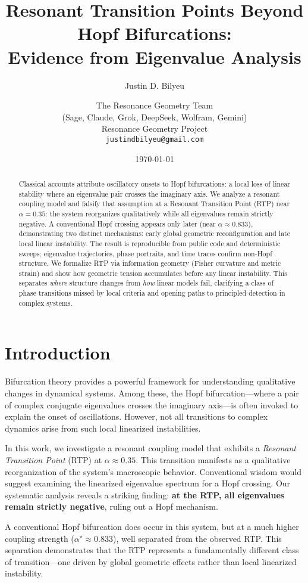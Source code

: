 \documentclass[11pt,twocolumn]{article}
\title{Resonant Transition Points Beyond Hopf Bifurcations:\\
Evidence from Eigenvalue Analysis}
\author{%
  Justin D. Bilyeu \and The Resonance Geometry Team\\
  (Sage, Claude, Grok, DeepSeek, Wolfram, Gemini)\\[0.5em]
  Resonance Geometry Project\\
  \texttt{justindbilyeu@gmail.com}
}
\date{\today}
\begin{document}
\maketitle

\begin{abstract}
Classical accounts attribute oscillatory onsets to Hopf bifurcations: a local loss of linear stability where an eigenvalue pair crosses the imaginary axis. We analyze a resonant coupling model and falsify that assumption at a Resonant Transition Point (RTP) near $\alpha\!=\!0.35$: the system reorganizes qualitatively while all eigenvalues remain strictly negative. A conventional Hopf crossing appears only later (near $\alpha\!\approx\!0.833$), demonstrating two distinct mechanisms: early global geometric reconfiguration and late local linear instability. The result is reproducible from public code and deterministic sweeps; eigenvalue trajectories, phase portraits, and time traces confirm non-Hopf structure. We formalize RTP via information geometry (Fisher curvature and metric strain) and show how geometric tension accumulates before any linear instability. This separates \emph{where} structure changes from \emph{how} linear models fail, clarifying a class of phase transitions missed by local criteria and opening paths to principled detection in complex systems.
\end{abstract}

\section{Introduction}

Bifurcation theory provides a powerful framework for understanding qualitative changes in dynamical systems.
Among these, the Hopf bifurcation—where a pair of complex conjugate eigenvalues crosses the imaginary axis—is
often invoked to explain the onset of oscillations. However, not all transitions to complex dynamics arise
from such local linearized instabilities.

In this work, we investigate a resonant coupling model that exhibits a \emph{Resonant Transition Point} (RTP)
at $\alpha \approx 0.35$. This transition manifests as a qualitative reorganization of the system's macroscopic
behavior. Conventional wisdom would suggest examining the linearized eigenvalue spectrum for a Hopf crossing.
Our systematic analysis reveals a striking finding: \textbf{at the RTP, all eigenvalues remain strictly negative},
ruling out a Hopf mechanism.

A conventional Hopf bifurcation does occur in this system, but at a much higher coupling strength
($\alpha^\star \approx 0.833$), well separated from the observed RTP. This separation demonstrates that the RTP
represents a fundamentally different class of transition—one driven by global geometric effects rather than
local linearized instability.
\end{document}
